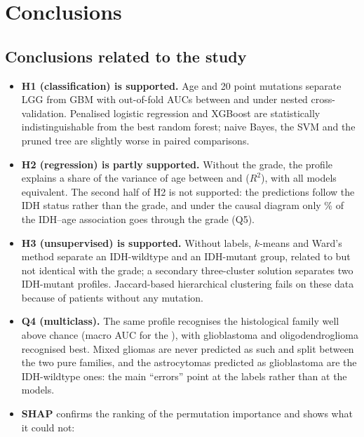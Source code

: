 \section{Conclusions}

\subsection{Conclusions related to the study}

\begin{itemize}
  \item \textbf{H1 (classification) is supported.} Age and 20 point mutations separate LGG from GBM
        with out-of-fold AUCs between \ClfMinAUC{} and \ClfMaxAUC{} under nested cross-validation. Penalised logistic
        regression and XGBoost are statistically indistinguishable from the best random forest;
        naive Bayes, the SVM and the pruned tree are slightly worse in paired comparisons.
  \item \textbf{H2 (regression) is partly supported.} Without the grade, the profile explains a share
        of the variance of age between \RegMinRTwo{} and \RegMaxRTwo{} ($R^2$), with all models
        equivalent. The second half of H2 is not supported: the predictions follow the IDH status
        rather than the grade, and under the causal diagram only \CsPropPct\% of the IDH--age
        association goes through the grade (Q5).
  \item \textbf{H3 (unsupervised) is supported.} Without labels, $k$-means and Ward's method
        separate an IDH-wildtype and an IDH-mutant group, related to but not identical with the
        grade; a secondary three-cluster solution separates two IDH-mutant profiles. Jaccard-based
        hierarchical clustering fails on these data because of patients without any mutation.
  \item \textbf{Q4 (multiclass).} The same profile recognises the histological family well above chance
        (macro AUC \McBestAUC{} for the \McBest), with glioblastoma and oligodendroglioma recognised
        best. Mixed gliomas are never predicted as such and split between the two pure families, and
        the astrocytomas predicted as glioblastoma are the IDH-wildtype ones: the main ``errors''
        point at the labels rather than at the models.
  \item \textbf{SHAP} confirms the ranking of the permutation importance and shows what it could not:

\end{itemize}
